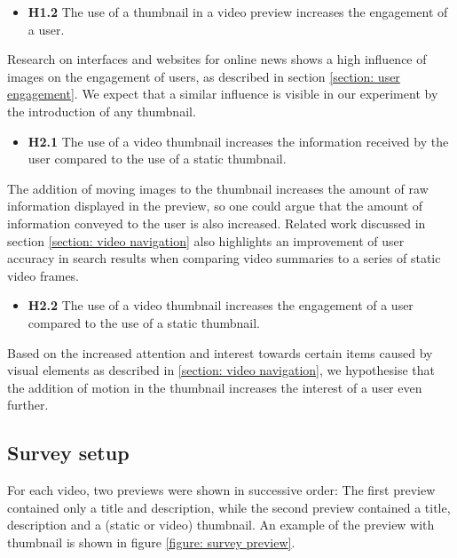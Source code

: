 \documentclass{../resources/sig-alternate-05-2015}
\begin{document}
\begin{itemize}
	\item \textbf{H1.2} The use of a thumbnail in a video preview increases the engagement of a user.
\end{itemize}

Research on interfaces and websites for online news shows a high influence of images on the engagement of users, as described in section \ref{section: user engagement}. We expect that a similar influence is visible in our experiment by the introduction of any thumbnail.

\begin{itemize}
	\item \textbf{H2.1} The use of a video thumbnail increases the information received by the user compared to the use of a static thumbnail.
\end{itemize}

The addition of moving images to the thumbnail increases the amount of raw information displayed in the preview, so one could argue that the amount of information conveyed to the user is also increased. Related work discussed in section \ref{section: video navigation} also highlights an improvement of user accuracy in search results when comparing video summaries to a series of static video frames.

\begin{itemize}
	\item \textbf{H2.2} The use of a video thumbnail increases the engagement of a user compared to the use of a static thumbnail.
\end{itemize}

Based on the increased attention and interest towards certain items caused by visual elements as described in \ref{section: video navigation}, we hypothesise that the addition of motion in the thumbnail increases the interest of a user even further.

\subsection{Survey setup}
For each video, two previews were shown in successive order: The first preview contained only a title and description, while the second preview contained a title, description and a (static or video) thumbnail. An example of the preview with thumbnail is shown in figure \ref{figure: survey preview}.
\end{document}
